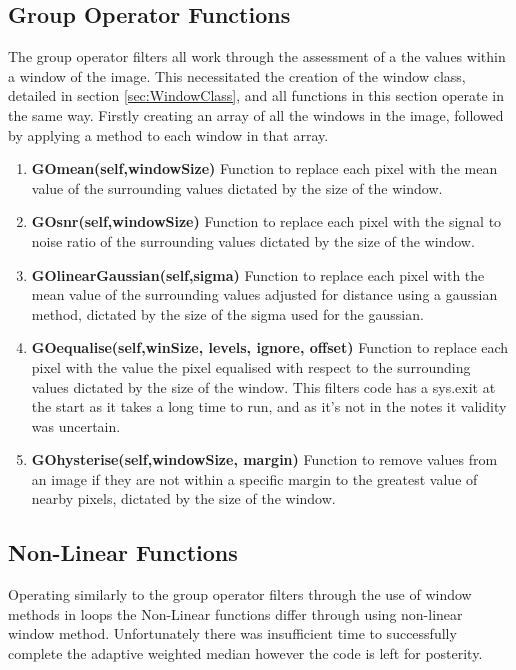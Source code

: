 \documentclass{article}
\begin{document}
\subsection{Group Operator Functions}
The group operator filters all work through the assessment of a the values within a window of the image. This necessitated the creation of the window class, detailed in section \ref{sec:WindowClass}, and all functions in this section operate in the same way. Firstly creating an array of all the windows in the image, followed by applying a method to each window in that array.

\begin{enumerate}
	\item{\textbf{GOmean(self,windowSize)}} Function to replace each pixel with the mean value of the surrounding values dictated by the size of the window.
	\item{\textbf{GOsnr(self,windowSize)}} Function to replace each pixel with the signal to noise ratio of the surrounding values dictated by the size of the window.
	\item{\textbf{GOlinearGaussian(self,sigma)}} Function to replace each pixel with the mean value of the surrounding values adjusted for distance using a gaussian method, dictated by the size of the sigma used for the gaussian.
	\item{\textbf{GOequalise(self,winSize, levels, ignore, offset)}} Function to replace each pixel with the value the pixel equalised with respect to the surrounding values dictated by the size of the window. This filters code has a sys.exit at the start as it takes a long time to run, and as it's not in the notes it validity was uncertain.
	\item{\textbf{GOhysterise(self,windowSize, margin)}} Function to remove values from an image if they are not within a specific margin to the greatest value of nearby pixels, dictated by the size of the window.
\end{enumerate}

\subsection{Non-Linear Functions}
Operating similarly to the group operator filters through the use of window methods in loops the Non-Linear functions differ through using non-linear window method. Unfortunately there was insufficient time to successfully complete the adaptive weighted median however the code is left for posterity.
\end{document}
